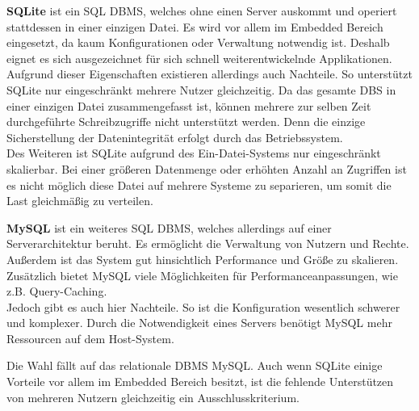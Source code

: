 \textbf{SQLite} ist ein \ac{SQL} \ac{DBMS}, welches ohne einen Server auskommt und operiert stattdessen in einer einzigen Datei. Es wird vor allem im Embedded Bereich eingesetzt, da kaum Konfigurationen oder Verwaltung notwendig ist. Deshalb eignet es sich ausgezeichnet für sich schnell weiterentwickelnde Applikationen.
\\
Aufgrund dieser Eigenschaften existieren allerdings auch Nachteile. So unterstützt SQLite nur eingeschränkt mehrere Nutzer gleichzeitig. Da das gesamte \ac{DBS} in einer einzigen Datei zusammengefasst ist, können mehrere zur selben Zeit durchgeführte Schreibzugriffe nicht unterstützt werden. Denn die einzige Sicherstellung der Datenintegrität erfolgt durch das Betriebssystem. 
\\
Des Weiteren ist SQLite aufgrund des Ein-Datei-Systems nur eingeschränkt skalierbar. Bei einer größeren Datenmenge oder erhöhten Anzahl an Zugriffen ist es nicht möglich diese Datei auf mehrere Systeme zu separieren, um somit die Last gleichmäßig zu verteilen.

\textbf{MySQL} ist ein weiteres \ac{SQL} \ac{DBMS}, welches allerdings auf einer Serverarchitektur beruht. 
Es ermöglicht die Verwaltung von Nutzern und Rechte. Außerdem ist das System gut hinsichtlich Performance und Größe zu skalieren. Zusätzlich bietet MySQL viele Möglichkeiten für Performanceanpassungen, wie z.B. Query-Caching.
\\
Jedoch gibt es auch hier Nachteile. So ist die Konfiguration wesentlich schwerer und komplexer. Durch die Notwendigkeit eines Servers benötigt MySQL mehr Ressourcen auf dem Host-System.

Die Wahl fällt auf das relationale \ac{DBMS} MySQL. Auch wenn SQLite einige Vorteile vor allem im Embedded Bereich besitzt, ist die fehlende Unterstützen von mehreren Nutzern gleichzeitig ein Ausschlusskriterium.

\cite{saake2010datenbanken}

